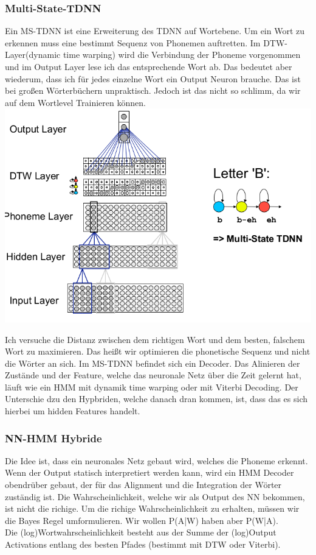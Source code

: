 \subsubsection{Multi-State-TDNN}
\label{sssect:MS-TDNN}
Ein MS-TDNN ist eine Erweiterung des TDNN auf Wortebene. Um ein Wort zu erkennen muss eine bestimmt Sequenz von Phonemen auftretten. Im DTW-Layer(dynamic time warping) wird die Verbindung der Phoneme vorgenommen und im Output Layer lese ich das entsprechende Wort ab. Das bedeutet aber wiederum, dass ich für jedes einzelne Wort ein Output Neuron brauche. Das ist bei großen Wörterbüchern unpraktisch. Jedoch ist das nicht so schlimm, da wir auf dem Wortlevel Trainieren können. \\
\includegraphics[scale=0.5]{MS-TDNN1}

Ich versuche die Distanz zwischen dem richtigen Wort und dem besten, falschem Wort zu maximieren. Das heißt wir optimieren die phonetische Sequenz und nicht die Wörter an sich.
Im MS-TDNN befindet sich ein Decoder. Das Alinieren der Zustände und der Feature, welche das neuronale Netz über die Zeit gelernt hat, läuft wie ein HMM mit dynamik time warping oder mit Viterbi Decoding. Der Unterschie dzu den Hypbriden, welche danach dran kommen, ist, dass das es sich hierbei um hidden Features handelt.

\subsubsection{NN-HMM Hybride}
Die Idee ist, dass ein neuronales Netz gebaut wird, welches die Phoneme erkennt. Wenn der Output statisch interpretiert werden kann, wird ein HMM Decoder obendrüber gebaut, der für das Alignment und die Integration der Wörter zuständig ist.
Die Wahrscheinlichkeit, welche wir als Output des NN bekommen, ist nicht die richige. Um die richige Wahrscheinlichkeit zu erhalten, müssen wir die Bayes Regel umformulieren. Wir wollen P(A|W) haben aber P(W|A).\\
Die (log)Wortwahrscheinlichkeit besteht aus der Summe der (log)Output Activations entlang des besten Pfades (bestimmt mit DTW oder Viterbi).

